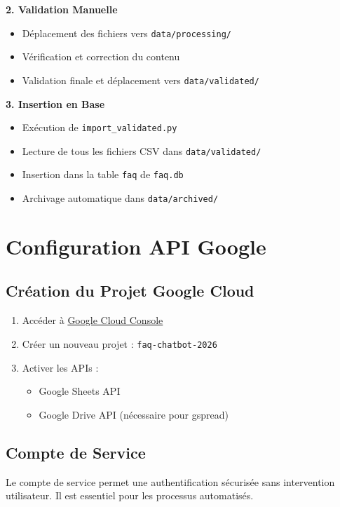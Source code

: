 \documentclass[11pt,a4paper]{article}
\begin{document}
\textbf{2. Validation Manuelle}
\begin{itemize}
    \item Déplacement des fichiers vers \texttt{data/processing/}
    \item Vérification et correction du contenu
    \item Validation finale et déplacement vers \texttt{data/validated/}
\end{itemize}

\textbf{3. Insertion en Base}
\begin{itemize}
    \item Exécution de \texttt{import\_validated.py}
    \item Lecture de tous les fichiers CSV dans \texttt{data/validated/}
    \item Insertion dans la table \texttt{faq} de \texttt{faq.db}
    \item Archivage automatique dans \texttt{data/archived/}
\end{itemize}

\section{Configuration API Google}
\label{sec:google-api}

\subsection{Création du Projet Google Cloud}
\begin{enumerate}
    \item Accéder à \href{https://console.cloud.google.com}{Google Cloud Console}
    \item Créer un nouveau projet : \texttt{faq-chatbot-2026}
    \item Activer les APIs :
    \begin{itemize}
        \item Google Sheets API
        \item Google Drive API (nécessaire pour gspread)
    \end{itemize}
\end{enumerate}

\subsection{Compte de Service}
\begin{info}
Le compte de service permet une authentification sécurisée sans intervention utilisateur. Il est essentiel pour les processus automatisés.
\end{info}
\end{document}
